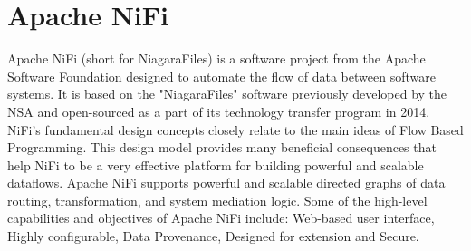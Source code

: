 \section{Apache NiFi}
Apache NiFi (short for NiagaraFiles) is a software project from the Apache Software Foundation designed to automate the flow of data between software systems. It is based on the "NiagaraFiles" software previously developed by the NSA and open-sourced as a part of its technology transfer program in 2014.\cite{nifi-wiki} NiFi’s fundamental design concepts closely relate to the main ideas of Flow Based Programming. This design model provides many beneficial consequences that help NiFi to be a very effective platform for building powerful and scalable dataflows. Apache NiFi supports powerful and scalable directed graphs of data routing, transformation, and system mediation logic.\cite{ nifi-overview} Some of the high-level capabilities and objectives of Apache NiFi include: Web-based user interface, Highly configurable, Data Provenance, Designed for extension and Secure. \cite{nifi-web}
 

